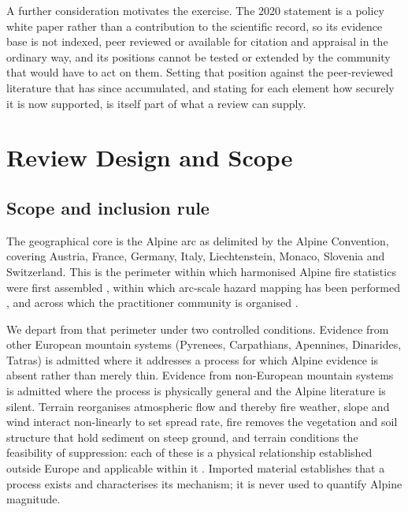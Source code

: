 \documentclass[11pt,a4paper]{article}
\begin{document}
A further consideration motivates the exercise. The 2020 statement is a policy white paper rather than a contribution to the scientific record, so its evidence base is not indexed, peer reviewed or available for citation and appraisal in the ordinary way, and its positions cannot be tested or extended by the community that would have to act on them. Setting that position against the peer-reviewed literature that has since accumulated, and stating for each element how securely it is now supported, is itself part of what a review can supply.


\section{Review Design and Scope}
\label{sec:scope}

\subsection{Scope and inclusion rule}

The geographical core is the Alpine arc as delimited by the Alpine Convention, covering Austria, France, Germany, Italy, Liechtenstein, Monaco, Slovenia and Switzerland. This is the perimeter within which harmonised Alpine fire statistics were first assembled \citep{valese_wildfires_2011, muller_forest_2020}, within which arc-scale hazard mapping has been performed \citep{gerberding_mapping_2025}, and across which the practitioner community is organised \citep{hoang_stakeholders_2026}.

We depart from that perimeter under two controlled conditions. Evidence from other European mountain systems (Pyrenees, Carpathians, Apennines, Dinarides, Tatras) is admitted where it addresses a process for which Alpine evidence is absent rather than merely thin. Evidence from non-European mountain systems is admitted where the process is physically general and the Alpine literature is silent. Terrain reorganises atmospheric flow and thereby fire weather, slope and wind interact non-linearly to set spread rate, fire removes the vegetation and soil structure that hold sediment on steep ground, and terrain conditions the feasibility of suppression: each of these is a physical relationship established outside Europe and applicable within it \citep{sharples_overview_2009, hayajneh_wind_2026, santi_wildfire_2022, morell_sediment_2021, cardil_assessing_2025}. Imported material establishes that a process exists and characterises its mechanism; it is never used to quantify Alpine magnitude.
\end{document}
